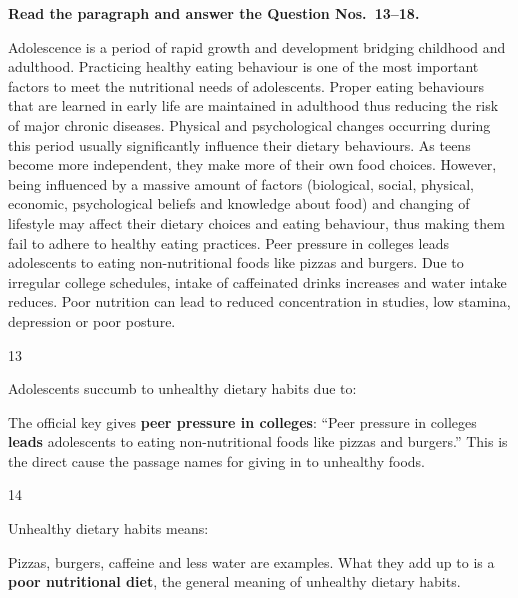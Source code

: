\begin{context}
\textbf{Read the paragraph and answer the Question Nos.~13--18.}\par\smallskip
Adolescence is a period of rapid growth and development bridging childhood and adulthood. Practicing healthy eating behaviour is one of the most important factors to meet the nutritional needs of adolescents. Proper eating behaviours that are learned in early life are maintained in adulthood thus reducing the risk of major chronic diseases. Physical and psychological changes occurring during this period usually significantly influence their dietary behaviours. As teens become more independent, they make more of their own food choices. However, being influenced by a massive amount of factors (biological, social, physical, economic, psychological beliefs and knowledge about food) and changing of lifestyle may affect their dietary choices and eating behaviour, thus making them fail to adhere to healthy eating practices. Peer pressure in colleges leads adolescents to eating non-nutritional foods like pizzas and burgers. Due to irregular college schedules, intake of caffeinated drinks increases and water intake reduces. Poor nutrition can lead to reduced concentration in studies, low stamina, depression or poor posture.
\end{context}
\begin{question}{13}
{Adolescents succumb to unhealthy dietary habits due to:\par}
\begin{explain}
The official key gives \textbf{peer pressure in colleges}: ``Peer pressure in colleges \textbf{leads} adolescents to eating non-nutritional foods like pizzas and burgers.'' This is the direct cause the passage names for giving in to unhealthy foods.
\end{explain}
\end{question}

\begin{question}{14}
{Unhealthy dietary habits means:\par}
\begin{explain}
Pizzas, burgers, caffeine and less water are examples. What they add up to is a \textbf{poor nutritional diet}, the general meaning of unhealthy dietary habits.
\end{explain}
\end{question}

